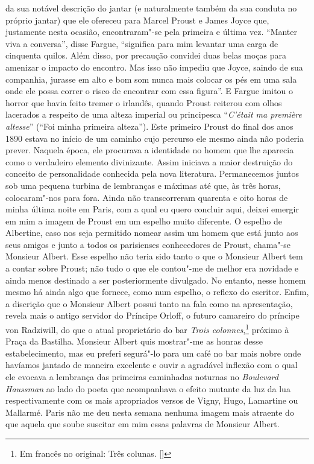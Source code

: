 da sua notável descrição do jantar (e naturalmente também da sua conduta
no próprio jantar) que ele ofereceu para Marcel Proust e James Joyce que,
justamente nesta ocasião, encontraram"-se pela primeira e última vez.
``Manter viva a conversa'', disse Fargue, ``significa para mim levantar
uma carga de cinquenta quilos. Além disso, por precaução convidei duas
belas moças para amenizar o impacto do encontro. Mas isso não impediu
que Joyce, saindo de sua companhia, jurasse em alto e bom som nunca mais
colocar os pés em uma sala onde ele possa correr o risco de encontrar
com essa figura''. E Fargue imitou o horror que havia feito tremer o
irlandês, quando Proust reiterou com olhos lacerados a respeito de uma
alteza imperial ou principesca ``\emph{C'était ma première altesse}'' %
(``Foi minha primeira alteza''). Este primeiro Proust do final dos
anos 1890 estava no início de um caminho cujo percurso ele mesmo ainda
não poderia prever. Naquela época, ele procurava a identidade no homem que lhe
aparecia como o verdadeiro elemento divinizante. Assim iniciava
a maior destruição do conceito de personalidade conhecida pela nova
literatura. Permanecemos juntos sob uma pequena turbina de lembranças
e máximas até que, às três horas, colocaram"-nos para fora. Ainda não
transcorreram quarenta e oito horas de minha última noite em Paris, com
a qual eu quero concluir aqui, deixei emergir em mim a imagem de Proust
em um espelho muito diferente. O espelho de Albertine, caso nos seja
permitido nomear assim um homem que está junto aos seus amigos e junto a
todos os parisienses conhecedores de Proust, chama"-se Monsieur Albert.
Esse espelho não teria sido tanto o que o Monsieur Albert tem a contar
sobre Proust; não tudo o que ele contou"-me de melhor era novidade e
ainda menos destinado a ser posteriormente divulgado. No entanto, nesse
homem mesmo há ainda algo que fornece, como num espelho, o reflexo do
escritor. Enfim, a discrição que o Monsieur Albert possui tanto na fala
como na apresentação, revela mais o antigo servidor do Príncipe Orloff,
o futuro camareiro do príncipe von Radziwill, do que o atual
proprietário do bar \emph{Trois colonnes},\footnote{Em francês no original: Três colunas. []} próximo à Praça da Bastilha.
Monsieur Albert quis mostrar"-me as honras desse estabelecimento, mas eu
preferi segurá"-lo para um café no bar mais nobre onde havíamos jantado
de maneira excelente e ouvir a agradável inflexão com o qual ele evocava %
a lembrança das primeiras caminhadas noturnas no \emph{Boulevard
Haussman} ao lado do poeta que acompanhava o efeito mutante da luz da
lua respectivamente com os mais apropriados versos de Vigny, Hugo,
Lamartine ou Mallarmé. Paris não me deu nesta semana nenhuma imagem mais
atraente do que aquela que soube suscitar em mim essas palavras de
Monsieur Albert.
